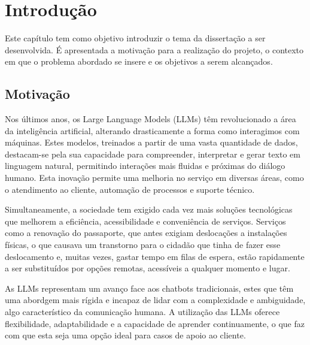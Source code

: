 
%

\chapter{Introdução}
\label{cha:introduction}


\epigraphfontsize{\small\itshape}
\setlength\epigraphwidth{12.5cm}
\setlength\epigraphrule{0pt}

\noindent Este capítulo tem como objetivo introduzir o tema da dissertação a ser desenvolvida. 
É apresentada a motivação para a realização do projeto, o contexto em que o problema abordado se insere e os objetivos a serem alcançados. 

\section{Motivação}
\label{sec:motivation}
Nos últimos anos, os Large Language Models (LLMs) têm revolucionado a área da inteligência artificial, alterando drasticamente a forma como interagimos com máquinas.
Estes modelos, treinados a partir de uma vasta quantidade de dados, destacam-se pela sua capacidade para compreender, interpretar e gerar texto em linguagem natural, permitindo interações mais fluidas e próximas do diálogo humano.
Esta inovação permite uma melhoria no serviço em diversas áreas, como o atendimento ao cliente, automação de processos e suporte técnico. 

Simultaneamente, a sociedade tem exigido cada vez mais soluções tecnológicas que melhorem a eficiência, acessibilidade e conveniência de serviços. 
Serviços como a renovação do passaporte, que antes exigiam deslocações a instalações físicas, o que causava um transtorno para o cidadão que tinha de fazer esse deslocamento e, muitas vezes, gastar tempo em filas de espera, estão rapidamente a ser substituídos por opções remotas, acessíveis a qualquer momento e lugar.

As LLMs representam um avanço face aos chatbots tradicionais, estes que têm uma abordgem mais rígida e incapaz de lidar com a complexidade e ambiguidade, algo característico da comunicação humana. 
A utilização das LLMs oferece flexibilidade, adaptabilidade e a capacidade de aprender continuamente, o que faz com que esta seja uma opção ideal para casos de apoio ao cliente.

